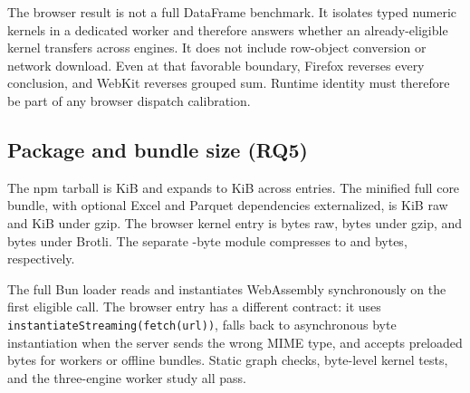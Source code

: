 \documentclass[pdflatex,sn-basic,Numbered]{sn-jnl}
\begin{document}
The browser result is not a full DataFrame benchmark. It isolates typed numeric kernels in a dedicated worker and therefore answers whether an already-eligible kernel transfers across engines. It does not include row-object conversion or network download. Even at that favorable boundary, Firefox reverses every conclusion, and WebKit reverses grouped sum. Runtime identity must therefore be part of any browser dispatch calibration.

\subsection{Package and bundle size (RQ5)}

The npm tarball is \NpmTarballKiB{} KiB and expands to \NpmUnpackedKiB{} KiB across \NpmEntryCount{} entries. The minified full core bundle, with optional Excel and Parquet dependencies externalized, is \CoreBundleKiB{} KiB raw and \CoreBundleGzipKiB{} KiB under gzip. The browser kernel entry is \BrowserBundleBytes{} bytes raw, \BrowserBundleGzipBytes{} bytes under gzip, and \BrowserBundleBrotliBytes{} bytes under Brotli. The separate \WasmBytes{}-byte module compresses to \WasmGzipBytes{} and \WasmBrotliBytes{} bytes, respectively.

\begin{center}
\centering
{}
\label{fig:size}
\end{center}

The full Bun loader reads and instantiates WebAssembly synchronously on the first eligible call. The browser entry has a different contract: it uses \texttt{instantiateStreaming(fetch(url))}, falls back to asynchronous byte instantiation when the server sends the wrong MIME type, and accepts preloaded bytes for workers or offline bundles. Static graph checks, byte-level kernel tests, and the three-engine worker study all pass.
\end{document}
